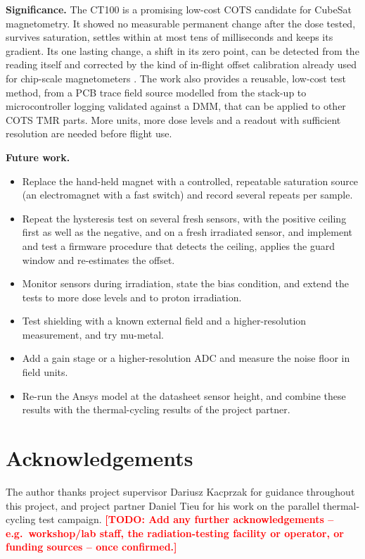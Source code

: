 \documentclass[12pt,a4paper]{article}
\newcommand{\todo}[1]{\textcolor{red}{\textbf{[TODO: #1]}}}
\begin{document}
\textbf{Significance.} The CT100 is a promising low-cost COTS candidate for CubeSat magnetometry. It showed no measurable permanent change after the dose tested, survives saturation, settles within at most tens of milliseconds and keeps its gradient. Its one lasting change, a shift in its zero point, can be detected from the reading itself and corrected by the kind of in-flight offset calibration already used for chip-scale magnetometers \cite{archer2015}. The work also provides a reusable, low-cost test method, from a PCB trace field source modelled from the stack-up to microcontroller logging validated against a DMM, that can be applied to other COTS TMR parts. More units, more dose levels and a readout with sufficient resolution are needed before flight use.

\textbf{Future work.}
\begin{itemize}
\item Replace the hand-held magnet with a controlled, repeatable saturation source (an electromagnet with a fast switch) and record several repeats per sample.
\item Repeat the hysteresis test on several fresh sensors, with the positive ceiling first as well as the negative, and on a fresh irradiated sensor, and implement and test a firmware procedure that detects the ceiling, applies the guard window and re-estimates the offset.
\item Monitor sensors during irradiation, state the bias condition, and extend the tests to more dose levels and to proton irradiation.
\item Test shielding with a known external field and a higher-resolution measurement, and try mu-metal.
\item Add a gain stage or a higher-resolution ADC and measure the noise floor in field units.
\item Re-run the Ansys model at the datasheet sensor height, and combine these results with the thermal-cycling results of the project partner.
\end{itemize}

\clearpage

\section*{Acknowledgements}

The author thanks project supervisor Dariusz Kacprzak for guidance throughout this project, and project partner Daniel Tieu for his work on the parallel thermal-cycling test campaign. \todo{Add any further acknowledgements -- e.g.\ workshop/lab staff, the radiation-testing facility or operator, or funding sources -- once confirmed.}
\end{document}
